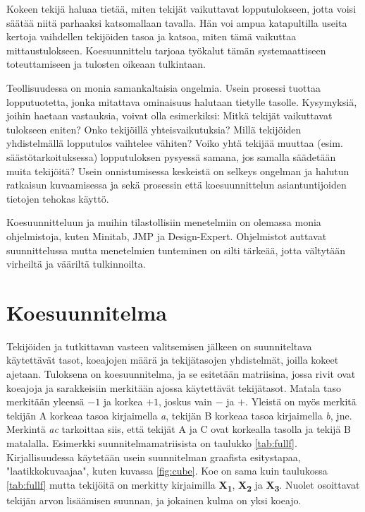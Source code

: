 \documentclass[12pt,a4paper,finnish]{tutthesis}
\begin{document}
Kokeen tekijä haluaa tietää, miten tekijät vaikuttavat lopputulokseen, jotta voisi
säätää niitä parhaaksi katsomallaan tavalla. Hän voi ampua katapultilla
useita kertoja vaihdellen
tekijöiden tasoa ja katsoa, miten tämä vaikuttaa mittaustulokseen. Koesuunnittelu
tarjoaa työkalut tämän systemaattiseen toteuttamiseen ja tulosten oikeaan
tulkintaan.

Teollisuudessa on monia samankaltaisia ongelmia. Usein prosessi tuottaa
lopputuotetta, jonka mitattava ominaisuus halutaan tietylle tasolle.
Kysymyksiä, joihin haetaan vastauksia, voivat olla esimerkiksi: Mitkä tekijät vaikuttavat
tulokseen eniten? Onko tekijöillä yhteisvaikutuksia? Millä tekijöiden yhdistelmällä
lopputulos vaihtelee vähiten? Voiko yhtä tekijää muuttaa (esim. säästötarkoituksessa)
lopputuloksen pysyessä samana, jos samalla säädetään muita tekijöitä?
Usein onnistumisessa keskeistä on selkeys ongelman ja halutun ratkaisun
kuvaamisessa ja sekä prosessin että koesuunnittelun asiantuntijoiden tietojen
tehokas käyttö.


Koesuunnitteluun ja muihin tilastollisiin menetelmiin on olemassa monia ohjelmistoja,
kuten Minitab, JMP ja Design-Expert. Ohjelmistot auttavat suunnittelussa
mutta menetelmien tunteminen on silti tärkeää, jotta vältytään virheiltä
ja vääriltä tulkinnoilta.

\section{Koesuunnitelma}
\label{doe}

Tekijöiden ja tutkittavan vasteen valitsemisen jälkeen on suunniteltava käytettävät
tasot, koeajojen määrä ja tekijätasojen yhdistelmät, joilla kokeet ajetaan.
Tuloksena on koesuunnitelma, ja se esitetään matriisina, jossa rivit ovat
koeajoja ja sarakkeisiin merkitään ajossa käytettävät tekijätasot.
Matala taso merkitään yleensä $-1$ ja korkea $+1$, joskus vain $-$ ja $+$.
Yleistä on myös merkitä tekijän A korkeaa tasoa kirjaimella \textit{a}, tekijän
B korkeaa tasoa kirjaimella \textit{b}, jne. Merkintä \textit{ac} tarkoittaa siis,
että
tekijät A ja C ovat korkealla tasolla ja tekijä B matalalla. Esimerkki
suunnitelmamatriisista on taulukko \ref{tab:fullf}.
Kirjallisuudessa käytetään usein suunnitelman graafista esitystapaa,
"laatikkokuvaajaa", kuten kuvassa \ref{fig:cube}.
Koe on sama kuin taulukossa \ref{tab:fullf} mutta tekijöitä on
merkitty kirjaimilla \textbf{X\textsubscript{1}}, \textbf{X\textsubscript{2}}
ja \textbf{X\textsubscript{3}}. Nuolet osoittavat tekijän arvon lisäämisen
suunnan, ja jokainen kulma on yksi koeajo.
\end{document}
